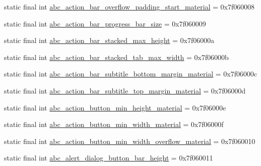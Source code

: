 \begin{DoxyCompactItemize}
\item 
static final int \mbox{\hyperlink{classandroid_1_1support_1_1v7_1_1appcompat_1_1_r_1_1dimen_ab0dff4068408e6b4044c261131d4cc03}{abc\+\_\+action\+\_\+bar\+\_\+overflow\+\_\+padding\+\_\+start\+\_\+material}} = 0x7f060008
\item 
static final int \mbox{\hyperlink{classandroid_1_1support_1_1v7_1_1appcompat_1_1_r_1_1dimen_a7cb8745e240f51173be9c254cf5fe2b8}{abc\+\_\+action\+\_\+bar\+\_\+progress\+\_\+bar\+\_\+size}} = 0x7f060009
\item 
static final int \mbox{\hyperlink{classandroid_1_1support_1_1v7_1_1appcompat_1_1_r_1_1dimen_a895826cc4d8c704a417035e05dd41304}{abc\+\_\+action\+\_\+bar\+\_\+stacked\+\_\+max\+\_\+height}} = 0x7f06000a
\item 
static final int \mbox{\hyperlink{classandroid_1_1support_1_1v7_1_1appcompat_1_1_r_1_1dimen_ad577ba39fef87f3d70dbf199191d5656}{abc\+\_\+action\+\_\+bar\+\_\+stacked\+\_\+tab\+\_\+max\+\_\+width}} = 0x7f06000b
\item 
static final int \mbox{\hyperlink{classandroid_1_1support_1_1v7_1_1appcompat_1_1_r_1_1dimen_aa35e5ba3767493b71859fbf99eb089ea}{abc\+\_\+action\+\_\+bar\+\_\+subtitle\+\_\+bottom\+\_\+margin\+\_\+material}} = 0x7f06000c
\item 
static final int \mbox{\hyperlink{classandroid_1_1support_1_1v7_1_1appcompat_1_1_r_1_1dimen_a00dc0188d267f39f6d85e3df16988c20}{abc\+\_\+action\+\_\+bar\+\_\+subtitle\+\_\+top\+\_\+margin\+\_\+material}} = 0x7f06000d
\item 
static final int \mbox{\hyperlink{classandroid_1_1support_1_1v7_1_1appcompat_1_1_r_1_1dimen_a371d25b458b3088905b862916bde0dcd}{abc\+\_\+action\+\_\+button\+\_\+min\+\_\+height\+\_\+material}} = 0x7f06000e
\item 
static final int \mbox{\hyperlink{classandroid_1_1support_1_1v7_1_1appcompat_1_1_r_1_1dimen_a4c445ec74d6c280421733fc114f2b3a3}{abc\+\_\+action\+\_\+button\+\_\+min\+\_\+width\+\_\+material}} = 0x7f06000f
\item 
static final int \mbox{\hyperlink{classandroid_1_1support_1_1v7_1_1appcompat_1_1_r_1_1dimen_a6b22c0a5d1378b0cbb2175d8c950d84d}{abc\+\_\+action\+\_\+button\+\_\+min\+\_\+width\+\_\+overflow\+\_\+material}} = 0x7f060010
\item 
static final int \mbox{\hyperlink{classandroid_1_1support_1_1v7_1_1appcompat_1_1_r_1_1dimen_a9b3e9a1fbd18f79de50390bef3db6a50}{abc\+\_\+alert\+\_\+dialog\+\_\+button\+\_\+bar\+\_\+height}} = 0x7f060011
\item 

\end{DoxyCompactItemize}
